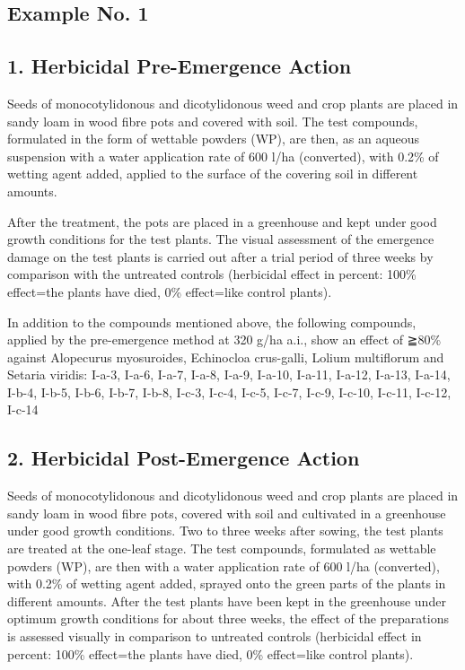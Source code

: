 \documentclass[11pt,a4paper]{article}
\begin{document}
\subsection{Example No. 1}

\subsection{1. Herbicidal Pre-Emergence Action}

Seeds of monocotylidonous and dicotylidonous weed and crop plants are placed in sandy loam in wood fibre pots and covered with soil. The test compounds, formulated in the form of wettable powders (WP), are then, as an aqueous suspension with a water application rate of 600 l/ha (converted), with 0.2\% of wetting agent added, applied to the surface of the covering soil in different amounts.

After the treatment, the pots are placed in a greenhouse and kept under good growth conditions for the test plants. The visual assessment of the emergence damage on the test plants is carried out after a trial period of three weeks by comparison with the untreated controls (herbicidal effect in percent: 100\% effect=the plants have died, 0\% effect=like control plants).

In addition to the compounds mentioned above, the following compounds, applied by the pre-emergence method at 320 g/ha a.i., show an effect of ≧80\% against Alopecurus myosuroides, Echinocloa crus-galli, Lolium multiflorum and Setaria viridis: I-a-3, I-a-6, I-a-7, I-a-8, I-a-9, I-a-10, I-a-11, I-a-12, I-a-13, I-a-14, I-b-4, I-b-5, I-b-6, I-b-7, I-b-8, I-c-3, I-c-4, I-c-5, I-c-7, I-c-9, I-c-10, I-c-11, I-c-12, I-c-14

\subsection{2. Herbicidal Post-Emergence Action}

Seeds of monocotylidonous and dicotylidonous weed and crop plants are placed in sandy loam in wood fibre pots, covered with soil and cultivated in a greenhouse under good growth conditions. Two to three weeks after sowing, the test plants are treated at the one-leaf stage. The test compounds, formulated as wettable powders (WP), are then with a water application rate of 600 l/ha (converted), with 0.2\% of wetting agent added, sprayed onto the green parts of the plants in different amounts. After the test plants have been kept in the greenhouse under optimum growth conditions for about three weeks, the effect of the preparations is assessed visually in comparison to untreated controls (herbicidal effect in percent: 100\% effect=the plants have died, 0\% effect=like control plants).
\end{document}
